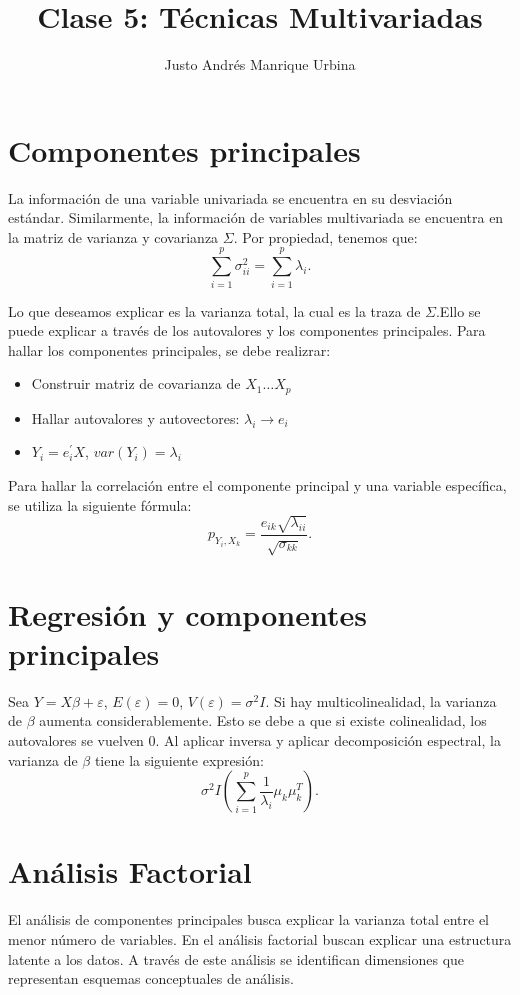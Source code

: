 \documentclass{article}
\title{Clase 5: Técnicas Multivariadas}
\author{Justo Andrés Manrique Urbina}
\begin{document}
\maketitle

\section{Componentes principales}
La información de una variable univariada se encuentra en su desviación estándar. Similarmente, la información de variables multivariada se encuentra en la matriz de varianza y covarianza $\Sigma$. Por propiedad, tenemos que:
\[ \sum_{i=1}^{p}\sigma^{2}_{ii}=\sum_{i=1}^{p}\lambda_{i}.\]

Lo que deseamos explicar es la varianza total, la cual es la traza de $\Sigma$.Ello se puede explicar a través de los autovalores y los componentes principales. Para hallar los componentes principales, se debe realizrar:
\begin{itemize}
	\item Construir matriz de covarianza de $X_{1}\ldots X_{p}$
	\item Hallar autovalores y autovectores: $\lambda_{i} \rightarrow e_{i}$
	\item $Y_{i}=e_{i}^{'}X$, $var(Y_{i})=\lambda_{i}$
\end{itemize}

Para hallar la correlación entre el componente principal y una variable específica, se utiliza la siguiente fórmula:
\[ p_{Y_{i},X_{k}}=\frac{e_{ik}\sqrt{\lambda_{ii}}}{\sqrt{\sigma_{kk}}}.\]

\section{Regresión y componentes principales}
Sea $Y=X\beta+\varepsilon$, $E{(\varepsilon)}=0$, $V{(\varepsilon)}=\sigma^{2}I$. Si hay multicolinealidad, la varianza de $\beta$ aumenta considerablemente. Esto se debe a que si existe colinealidad, los autovalores se vuelven 0. Al aplicar inversa y aplicar decomposición espectral, la varianza de $\beta$ tiene la siguiente expresión:
\[ \sigma^{2}I {(\sum_{i=1}^{p}\frac{1}{\lambda_{i}}\mu_{k}\mu_{k}^{T})}.\]

\section{Análisis Factorial}
El análisis de componentes principales busca explicar la varianza total entre el menor número de variables. En el análisis factorial buscan explicar una estructura latente a los datos. A través de este análisis se identifican dimensiones que representan esquemas conceptuales de análisis.
\end{document}
